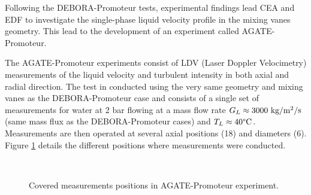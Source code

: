 Following the DEBORA-Promoteur tests, experimental findings lead CEA and EDF to investigate the single-phase liquid velocity profile in the mixing vanes geometry. This lead to the development of an experiment called AGATE-Promoteur.

\npar

The AGATE-Promoteur experiments consist of LDV (Laser Doppler Velocimetry) measurements of the liquid velocity and turbulent intensity in both axial and radial direction. The test in conducted using the very same geometry and mixing vanes as the DEBORA-Promoteur case and consists of a single set of measurements for water at 2 bar flowing at a mass flow rate $G_{L} \approx 3000\ \text{kg/m$^{2}$/s}$ (same mass flux as the DEBORA-Promoteur cases) and $T_{L} \approx 40\degree\mathrm{C}$. Measurements are then operated at several axial positions (18) and diameters (6). Figure \ref{fig:agate_mes} details the different positions where measurements were conducted.




\begin{figure}[!h]
\centering
{}
\\
\caption{Covered measurements positions in AGATE-Promoteur experiment.}
\label{fig:agate_mes}
\end{figure}


